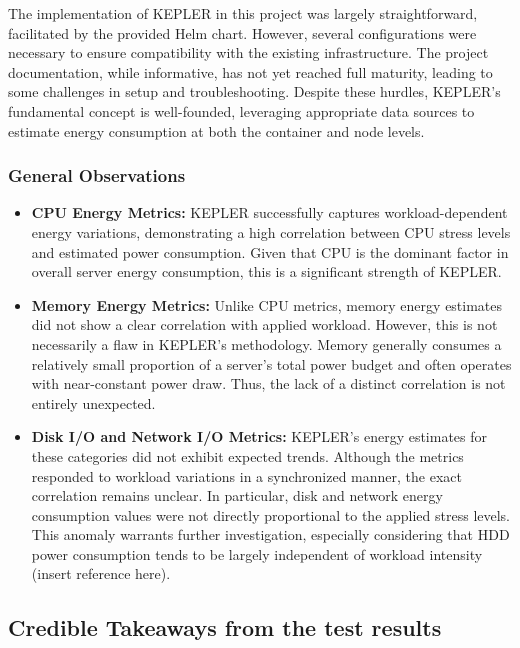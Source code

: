The implementation of KEPLER in this project was largely straightforward, facilitated by the provided Helm chart. However, several configurations were necessary to ensure compatibility with the existing infrastructure. The project documentation, while informative, has not yet reached full maturity, leading to some challenges in setup and troubleshooting. Despite these hurdles, KEPLER’s fundamental concept is well-founded, leveraging appropriate data sources to estimate energy consumption at both the container and node levels.

\subsubsection{General Observations}

\begin{itemize}
\item \textbf{CPU Energy Metrics:}
KEPLER successfully captures workload-dependent energy variations, demonstrating a high correlation between CPU stress levels and estimated power consumption. Given that CPU is the dominant factor in overall server energy consumption, this is a significant strength of KEPLER.
\item \textbf{Memory Energy Metrics:}
Unlike CPU metrics, memory energy estimates did not show a clear correlation with applied workload. However, this is not necessarily a flaw in KEPLER’s methodology. Memory generally consumes a relatively small proportion of a server’s total power budget and often operates with near-constant power draw. Thus, the lack of a distinct correlation is not entirely unexpected.
\item \textbf{Disk I/O and Network I/O Metrics:}
KEPLER’s energy estimates for these categories did not exhibit expected trends. Although the metrics responded to workload variations in a synchronized manner, the exact correlation remains unclear. In particular, disk and network energy consumption values were not directly proportional to the applied stress levels. This anomaly warrants further investigation, especially considering that HDD power consumption tends to be largely independent of workload intensity (insert reference here).
\end{itemize}

\subsection{Credible Takeaways from the test results}

